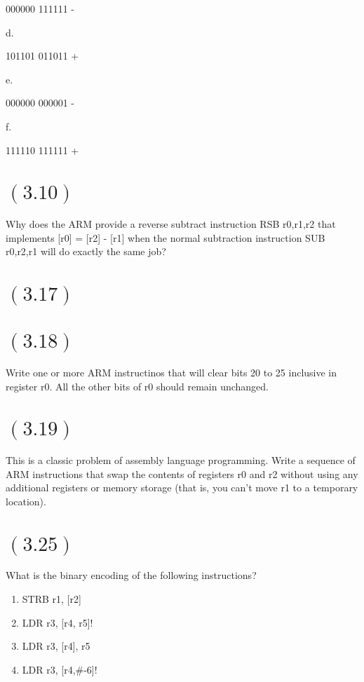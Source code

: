 \documentclass[letterpaper,12pt,titlepage]{article}
\begin{document}
000000
111111
-

d. 

101101
011011
+

e.

000000
000001
-

f.

111110
111111
+

\section*{$(3.10)$} Why does the ARM provide a reverse subtract instruction RSB r0,r1,r2 that implements [r0] = [r2] - [r1] when the normal subtraction instruction SUB r0,r2,r1 will do exactly the same job?

\section*{$(3.17)$} 

\section*{$(3.18)$} Write one or more ARM instructinos that will clear bits 20 to 25 inclusive in register r0. All the other bits of r0 should remain unchanged.

\section*{$(3.19)$} This is a classic problem of assembly language programming. Write a sequence of ARM instructions that swap the contents of registers r0 and r2 without using any additional registers or memory storage (that is, you can't move r1 to a temporary location).

\section*{$(3.25)$} What is the binary encoding of the following instructions?


\renewcommand{\labelenumi}{\alph{enumi})}
\begin{enumerate}

\item STRB r1, [r2]

\item LDR r3, [r4, r5]!

\item LDR r3, [r4], r5

\item LDR r3, [r4,\#-6]!

\end{enumerate}
\end{document}
